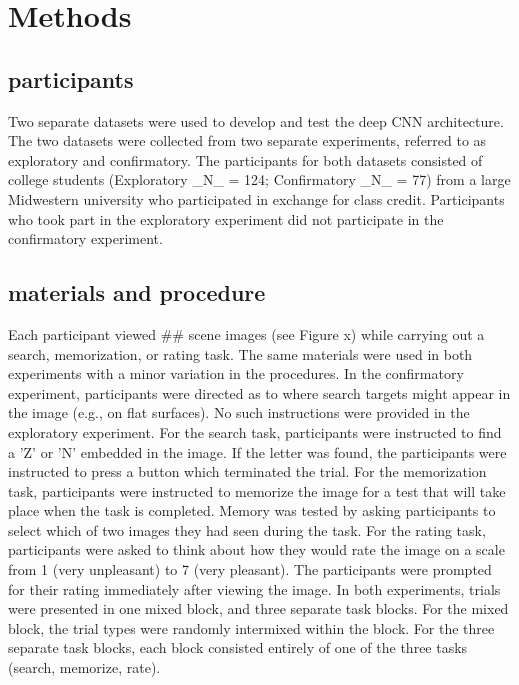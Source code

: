 \section{Methods}

\subsection{participants}
Two separate datasets were used to develop and test the deep CNN architecture. The two datasets were collected from two separate experiments, referred to as exploratory and confirmatory. The participants for both datasets consisted of college students (Exploratory _N_ = 124; Confirmatory _N_ = 77) from a large Midwestern university who participated in exchange for class credit. Participants who took part in the exploratory experiment did not participate in the confirmatory experiment. 

\subsection{materials and procedure}
Each participant viewed ## scene images (see Figure x) while carrying out a search, memorization, or rating task. The same materials were used in both experiments with a minor variation in the procedures. In the confirmatory experiment, participants were directed as to where search targets might appear in the image (e.g., on flat surfaces). No such instructions were provided in the exploratory experiment. For the search task, participants were instructed to find a 'Z' or 'N' embedded in the image. If the letter was found, the participants were instructed to press a button which terminated the trial. For the memorization task, participants were instructed to memorize the image for a test that will take place when the task is completed. Memory was tested by asking participants to select which of two images they had seen during the task. For the rating task, participants were asked to think about how they would rate the image on a scale from 1 (very unpleasant) to 7 (very pleasant). The participants were prompted for their rating immediately after viewing the image. In both experiments, trials were presented in one mixed block, and three separate task blocks. For the mixed block, the trial types were randomly intermixed within the block. For the three separate task blocks, each block consisted entirely of one of the three tasks (search, memorize, rate).


